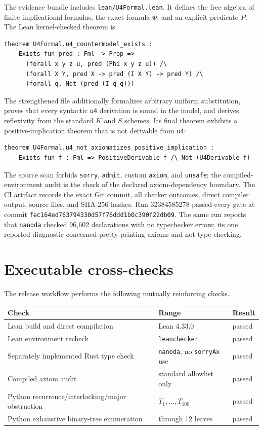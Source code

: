 \documentclass[11pt]{article}
\begin{document}
The evidence bundle includes \texttt{lean/U4Formal.lean}.  It defines
the free algebra of finite implicational formulas, the exact formula $\Phi$,
and an explicit predicate $P$.  The Lean kernel-checked theorem is
\begin{verbatim}
theorem U4Formal.u4_countermodel_exists :
    Exists fun pred : Fml -> Prop =>
      (forall x y z u, pred (Phi x y z u)) /\
      (forall X Y, pred X -> pred (I X Y) -> pred Y) /\
      (forall q, Not (pred (I q q)))
\end{verbatim}
The strengthened file additionally formalizes arbitrary uniform substitution,
proves that every syntactic \texttt{u4} derivation is sound in the model, and
derives reflexivity from the standard $K$ and $S$ schemes.  Its final theorem
exhibits a positive-implication theorem that is not derivable from \texttt{u4}:
\begin{verbatim}
theorem U4Formal.u4_not_axiomatizes_positive_implication :
    Exists fun f : Fml => PositiveDerivable f /\ Not (U4Derivable f)
\end{verbatim}
The source scan forbids \texttt{sorry}, \texttt{admit}, custom
\texttt{axiom}, and \texttt{unsafe}; the compiled-environment audit is the
check of the declared axiom-dependency boundary.  The CI artifact records the exact
Git commit, all checker outcomes, direct compiler output, source files, and
SHA-256 hashes.  Run 32384585278 passed every gate at commit
\texttt{fec164ed763794330d57f76ddd1b0c390f22db09}.  The same run reports that
\texttt{nanoda} checked 96,602 declarations with no typechecker errors; its one
reported diagnostic concerned pretty-printing axioms and not type checking.

\section{Executable cross-checks}

The release workflow performs the following mutually reinforcing checks.

\begin{center}
\begin{tabular}{@{}lll@{}}
\toprule
Check & Range & Result\\
\midrule
Lean build and direct compilation & Lean 4.33.0 & passed\\
Lean environment recheck & \texttt{leanchecker} & passed\\
Separately implemented Rust type check & \texttt{nanoda}, no \texttt{sorryAx} use & passed\\
Compiled axiom audit & standard allowlist only & passed\\
Python recurrence/interlocking/major obstruction & $T_1,\ldots,T_{100}$ & passed\\
Python exhaustive binary-tree enumeration & through 12 leaves & passed\\
\bottomrule
\end{tabular}
\end{center}
\end{document}
